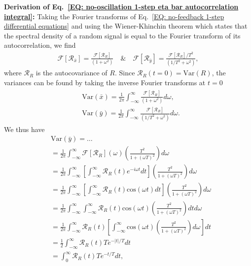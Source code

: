 \documentclass[%
 reprint,prx,
superscriptaddress,
%
%
%
%
%
%
%
%
%
 amsmath,amssymb,
 aps,
%
%
%
%
%
%
]{revtex4-2}
\begin{document}
\noindent \textbf{Derivation of Eq.~\eqref{EQ: no-oscillation 1-step eta bar autocorrelation integral}:} Taking the Fourier transforms of Eq.~\eqref{EQ: no-feedback 1-step differential equations} and using the Wiener-Khinchin theorem \cite{davenport1958introduction} which states that the spectral density of a random signal is equal to the Fourier transform of its autocorrelation, we find
 \begin{align*}
 \mathcal{F}[\mathcal{R}_{\bar{x}}] = \frac{\mathcal{F}[\mathcal{R}_{R}]}{(1 + \omega^{2})} \quad \text{\&} \quad \mathcal{F}[\mathcal{R}_{\bar{y}}] = \frac{\mathcal{F}[\mathcal{R}_{R}]/T^{2}}{(1/T^{2} + \omega^{2})}
,
\end{align*}
where $\mathcal{R}_{R}$ is the autocovariance of $R$. 
Since $\mathcal{R}_{R}(t = 0) = \text{Var}(R)$, the variances can be found by taking the inverse Fourier transforms at $t = 0$
\begin{align}
\begin{split}
 &\text{Var}(\bar{x}) = \frac{1}{2\pi}\int_{-\infty}^{\infty}\frac{\mathcal{F}[\mathcal{R}_{R}]}{(1 + \omega^{2})}d\omega ,
 \\ &\text{Var}(\bar{y}) = \frac{1}{2\pi}\int_{-\infty}^{\infty}\frac{\mathcal{F}[\mathcal{R}_{R}]}{(1/T^{2} + \omega^{2})}d\omega
 .
\end{split}
\label{EQ: no-feedback 1-step single bar variances from Fourier}
\end{align}
We thus have
\begin{equation*}
\begin{split}
    &\text{Var}(\bar{y}) = \dots\\
    &= \frac{1}{2\pi}\int_{-\infty}^{\infty}\mathcal{F}[\mathcal{R}_{R}](\omega)\left( \frac{T^{2}}{1 + (\omega T)^{2}} \right)d\omega \\
    &= \frac{1}{2\pi}\int_{-\infty}^{\infty}\left[\int_{-\infty}^{\infty}\mathcal{R}_{R}(t)e^{-i\omega t}dt\right] \left( \frac{T^{2}}{1 + (\omega T)^{2}} \right)d\omega\\
    &= \frac{1}{2\pi}\int_{-\infty}^{\infty}\left[\int_{-\infty}^{\infty}\mathcal{R}_{R}(t)\text{cos}(\omega t)dt\right] \left( \frac{T^{2}}{1 + (\omega T)^{2}} \right)d\omega\\
    &= \frac{1}{2\pi}\int_{-\infty}^{\infty}\int_{-\infty}^{\infty}\mathcal{R}_{R}(t)\text{cos}(\omega t) \left( \frac{T^{2}}{1 + (\omega T)^{2}} \right)dt d\omega \\
    &= \frac{1}{2\pi}\int_{-\infty}^{\infty}\mathcal{R}_{R}(t)\left[\int_{-\infty}^{\infty}\text{cos}(\omega t) \left( \frac{T^{2}}{1 + (\omega T)^{2}} \right)d\omega\right] dt \\
    &= \frac{1}{2}\int_{-\infty}^{\infty}\mathcal{R}_{R}(t)T e^{-|t|/T}  dt \\
    &= \int_{0}^{\infty}\mathcal{R}_{R}(t)T e^{-t/T}  dt ,
    \end{split}
\end{equation*}
\end{document}
